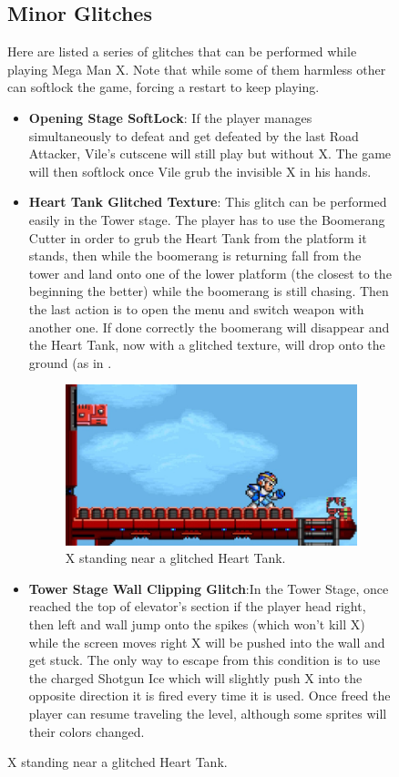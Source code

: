 \begin{figure}[htp]
\subsection{Minor Glitches}
Here are listed a series of glitches that can be performed while playing Mega Man X. Note that while some of them harmless other can softlock the game, forcing a restart to keep playing.
\begin{itemize}
	\item \textbf{Opening Stage SoftLock}: If the player manages simultaneously to defeat and get defeated by the last Road Attacker, Vile's cutscene will still play but without X. The game will then softlock once Vile grub the invisible X in his hands.
	\item \textbf{Heart Tank Glitched Texture}: This glitch can be performed easily in the Tower stage. The player has to use the Boomerang Cutter in order to grub the Heart Tank from the platform it stands, then while the boomerang is returning fall from the tower and land onto one of the lower platform (the closest to the beginning the better) while the boomerang is still chasing. Then the last action is to open the menu and switch weapon with another one. If done correctly the boomerang will disappear and the Heart Tank, now with a glitched texture, will drop onto the ground (as in .
	\begin{figure}[htp]
		\centering
		\includegraphics[width=0.5\linewidth]{figures/X1/Miscs/Tower_glitched_heart.jpg}
		\caption{X standing near a glitched Heart Tank.}
	\end{figure}
	\item \textbf{Tower Stage Wall Clipping Glitch}:In the Tower Stage, once reached the top of elevator's section if the player head right, then left and wall jump onto the spikes (which won't kill X) while the screen moves right X will be pushed into the wall and get stuck. The only way to escape from this condition is to use the charged Shotgun Ice which will slightly push X into the opposite direction it is fired every time it is used. Once freed the player can resume traveling the level, although some sprites will their colors changed.

\end{itemize}
\end{figure}
